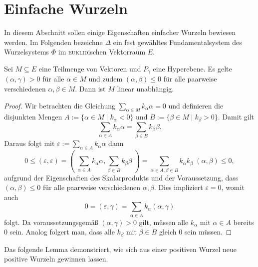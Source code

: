 \section{Einfache Wurzeln}
\label{sec:einfach}

In diesem Abschnitt sollen einige Eigenschaften einfacher Wurzeln bewiesen werden.  
Im Folgenden bezeichne $\Delta$ ein fest gewähltes Fundamentalsystem des Wurzelsystems $\Phi$ im \textsc{euklid}ischen Vektorraum $E$.

\begin{lem}
  \label{lem:independentSet}
  Sei $M \subseteq E$ eine Teilmenge von Vektoren und $P_\gamma$ eine Hyperebene.
  Es gelte $(\alpha, \gamma) > 0$ für alle $\alpha \in M$ und zudem $(\alpha, \beta) \leq 0$ für alle paarweise verschiedenen $\alpha, \beta \in M$.
  Dann ist $M$ linear unabhängig.
\end{lem}

\begin{proof}
  Wir betrachten die Gleichung $\sum_{\alpha \in M} k_\alpha \alpha = 0$ und definieren die disjunkten Mengen $A := \{\alpha \in M \mid k_\alpha < 0\}$ und  $B := \{\beta \in M \mid k_\beta > 0\}$. 
  Damit gilt 
  \begin{displaymath}
    \sum_{\alpha \in A} k_\alpha \alpha = \sum_{\beta \in B} k_\beta \beta.
  \end{displaymath}
  Daraus folgt mit $\varepsilon := \sum_{\alpha \in A} k_\alpha \alpha$ dann
  \begin{displaymath}
    0 
    \leq (\varepsilon, \varepsilon) 
    = (\;\sum_{\alpha \in A} k_\alpha \alpha,\sum_{\beta \in B} k_\beta \beta\;) 
    = \sum_{\alpha \in A, \beta \in B} k_\alpha k_\beta \; (\alpha, \beta) 
    \leq 0,
  \end{displaymath}
  aufgrund der Eigenschaften des Skalarprodukts und der Voraussetzung, dass $(\alpha, \beta) \leq 0$ für alle paarweise verschiedenen $\alpha, \beta$.
  Dies impliziert $\varepsilon = 0$, womit auch 
  \begin{displaymath}
    0 = (\varepsilon, \gamma) = \sum_{\alpha \in A} k_\alpha (\alpha, \gamma)
  \end{displaymath}
  folgt. Da voraussetzungsgemäß $(\alpha, \gamma) > 0$ gilt, müssen alle $k_\alpha$ mit $\alpha \in A$ bereits $0$ sein.
  Analog folgert man, dass alle $k_\beta$ mit $\beta \in B$ gleich $0$ sein müssen.
\end{proof}

Das folgende Lemma demonstriert, wie sich aus einer positiven Wurzel neue positive Wurzeln gewinnen lassen.

